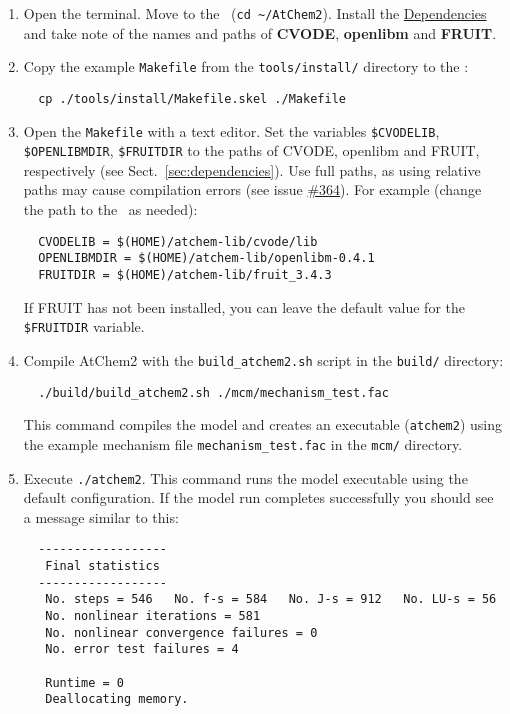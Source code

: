 \begin{enumerate}
\item Open the terminal. Move to the \maindir\ (\verb|cd ~/AtChem2|).
  Install the \hyperref[sec:dependencies]{Dependencies} and take note
  of the names and paths of \textbf{CVODE}, \textbf{openlibm} and
  \textbf{FRUIT}.
\item Copy the example \texttt{Makefile} from the
  \texttt{tools/install/} directory to the \maindir:
  \begin{verbatim}
  cp ./tools/install/Makefile.skel ./Makefile
  \end{verbatim}
\item Open the \texttt{Makefile} with a text editor. Set the variables
  \texttt{\$CVODELIB}, \texttt{\$OPENLIBMDIR}, \texttt{\$FRUITDIR} to the
  paths of CVODE, openlibm and FRUIT, respectively (see
  Sect.~\ref{sec:dependencies}). Use full paths, as using relative
  paths may cause compilation errors (see issue
  \href{https://github.com/AtChem/AtChem2/issues/364}{\#364}). For
  example (change the path to the \depdir\ as needed):
  \begin{verbatim}
  CVODELIB = $(HOME)/atchem-lib/cvode/lib
  OPENLIBMDIR = $(HOME)/atchem-lib/openlibm-0.4.1
  FRUITDIR = $(HOME)/atchem-lib/fruit_3.4.3
  \end{verbatim}
  If FRUIT has not been installed, you can leave the default value for
  the \texttt{\$FRUITDIR} variable.
\item Compile AtChem2 with the \texttt{build\_atchem2.sh} script in
  the \texttt{build/} directory:
  \begin{verbatim}
  ./build/build_atchem2.sh ./mcm/mechanism_test.fac
  \end{verbatim}
  This command compiles the model and creates an executable
  (\texttt{atchem2}) using the example mechanism file
  \texttt{mechanism\_test.fac} in the \texttt{mcm/} directory.
\item Execute \verb|./atchem2|. This command runs the model executable
  using the default configuration. If the model run completes
  successfully you should see a message similar to this:
  \begin{verbatim}
  ------------------
   Final statistics
  ------------------
   No. steps = 546   No. f-s = 584   No. J-s = 912   No. LU-s = 56
   No. nonlinear iterations = 581
   No. nonlinear convergence failures = 0
   No. error test failures = 4

   Runtime = 0
   Deallocating memory.
  \end{verbatim}
\end{enumerate}

